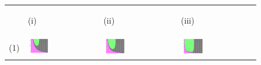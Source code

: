 \documentclass[12pt]{UOthesis}
\theoremstyle{remarkstyle}
\begin{document}
\begin{figure}[h!]
	\centering
	\begin{tabular}{m{0.07cm} m{4.5cm}  m{4.5cm}  m{4.5cm}}
		& \begin{center}
			(i)
		\end{center} & \begin{center}
			(ii)
		\end{center} & \begin{center}
			(iii)
		\end{center}\\
		(1) & \includegraphics[width=0.33\textwidth]{HLOOwlSimpPOMutualInvasionOnSteadyState1.png} & \includegraphics[width=0.33\textwidth]{HLOOwlSimpPOMutualInvasionOnSteadyState2.png} & \includegraphics[width=0.33\textwidth]{HLOOwlSimpPOMutualInvasionOnSteadyState3.png}\\
		

\end{tabular}
\end{figure}
\end{document}
